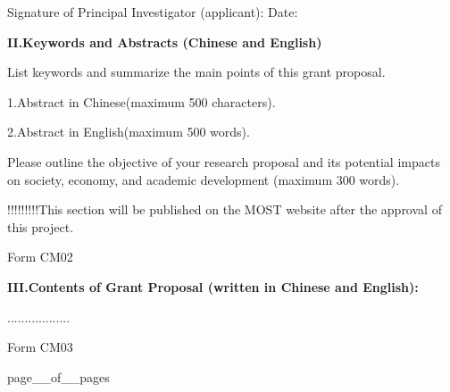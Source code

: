 \documentclass[12pt, a4paper]{article}
\begin{document}
Signature of Principal Investigator (applicant):                 Date:

\textbf{II.Keywords and Abstracts (Chinese and English)}

  List keywords and summarize the main points of this grant proposal.

  1.Abstract in Chinese(maximum 500 characters).

  2.Abstract in English(maximum 500 words).

  Please outline the objective of your research proposal and its potential impacts on society, economy, and academic development (maximum 300 words).


!!!!!!!!!This section will be published on the MOST website after the approval of this project.

  Form CM02


\textbf{III.Contents of Grant Proposal (written in Chinese and English):}

  ..................




  Form CM03

  page__of__pages
\end{document}
